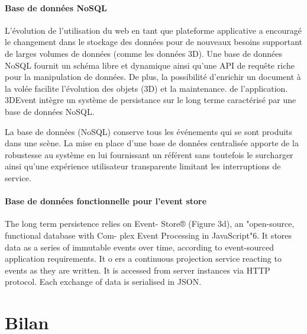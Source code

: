 \paragraph{Base de données NoSQL}\label{p:nosql} L'évolution de 
l'utilisation du web en tant que plateforme applicative a encouragé le changement 
dans le stockage des données pour de nouveaux besoins supportant de larges 
volumes de données (comme les données 3D). Une base de données \gls{NoSQL} 
fournit un schéma libre et dynamique ainsi qu'une API de requête riche pour la 
manipulation de données. De plus, la possibilité d'enrichir un document \og à la volée\fg{} 
facilite l'évolution des objets (3D) et la maintenance. de l'application.
3DEvent intègre un système de persistance sur le long terme caractérisé par une 
base de données \gls{NoSQL}.

La base de données (\gls{NoSQL}) conserve tous les événements qui se
sont produits dans une scène. 
La mise en place d'une base de données centralisée apporte de la robustesse au 
système en lui fournissant un référent sans toutefois le surcharger ainsi qu'une 
expérience utilisateur transparente limitant les interruptions de service.



\paragraph{Base de données fonctionnelle pour l'event store}
The long term persistence relies on Event- Store® (Figure 3d), an "open-source, 
functional database with Com- plex Event Processing in JavaScript"6. It stores 
data as a series of immutable events over time, according to event-sourced 
application requirements. It o ers a continuous projection service reacting to 
events as they are written. It is accessed from server instances via HTTP 
protocol. Each exchange of data is serialised in JSON.

\section{Bilan}



